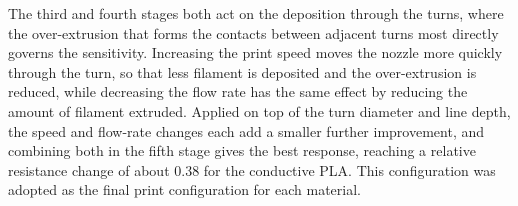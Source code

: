 
The third and fourth stages both act on the deposition through the turns, where the over-extrusion that forms the contacts between adjacent turns most directly governs the sensitivity. Increasing the print speed moves the nozzle more quickly through the turn, so that less filament is deposited and the over-extrusion is reduced, while decreasing the flow rate has the same effect by reducing the amount of filament extruded. Applied on top of the turn diameter and line depth, the speed and flow-rate changes each add a smaller further improvement, and combining both in the fifth stage gives the best response, reaching a relative resistance change of about \num{0.38} for the conductive PLA. This configuration was adopted as the final print configuration for each material.
 
